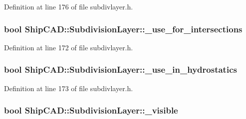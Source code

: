 Definition at line 176 of file subdivlayer.\+h.

\subsubsection[{\texorpdfstring{\+\_\+use\+\_\+for\+\_\+intersections}{_use_for_intersections}}]{\setlength{\rightskip}{0pt plus 5cm}bool Ship\+C\+A\+D\+::\+Subdivision\+Layer\+::\+\_\+use\+\_\+for\+\_\+intersections\hspace{0.3cm}{\ttfamily [protected]}}\hypertarget{classShipCAD_1_1SubdivisionLayer_a8213aa3e02493472fb11949f595446f2}{}\label{classShipCAD_1_1SubdivisionLayer_a8213aa3e02493472fb11949f595446f2}


Definition at line 172 of file subdivlayer.\+h.

\subsubsection[{\texorpdfstring{\+\_\+use\+\_\+in\+\_\+hydrostatics}{_use_in_hydrostatics}}]{\setlength{\rightskip}{0pt plus 5cm}bool Ship\+C\+A\+D\+::\+Subdivision\+Layer\+::\+\_\+use\+\_\+in\+\_\+hydrostatics\hspace{0.3cm}{\ttfamily [protected]}}\hypertarget{classShipCAD_1_1SubdivisionLayer_ad36d65882f0c46ff1b3ced7d48c173f4}{}\label{classShipCAD_1_1SubdivisionLayer_ad36d65882f0c46ff1b3ced7d48c173f4}


Definition at line 173 of file subdivlayer.\+h.

\subsubsection[{\texorpdfstring{\+\_\+visible}{_visible}}]{\setlength{\rightskip}{0pt plus 5cm}bool Ship\+C\+A\+D\+::\+Subdivision\+Layer\+::\+\_\+visible\hspace{0.3cm}{\ttfamily [protected]}}\hypertarget{classShipCAD_1_1SubdivisionLayer_a2d606476aba40bbbfc115c449f46ac26}{}\label{classShipCAD_1_1SubdivisionLayer_a2d606476aba40bbbfc115c449f46ac26}


